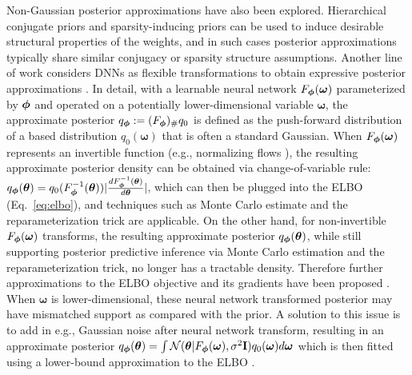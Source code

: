 Non-Gaussian posterior approximations have also been explored. Hierarchical conjugate priors \citep{kessler2021ibpbnn} and sparsity-inducing priors \citep{ghosh2019model,bai2020efficient} can be used to induce desirable structural properties of the weights, and in such cases posterior approximations typically share similar conjugacy or sparsity structure assumptions. 
%
Another line of work considers DNNs as flexible transformations to obtain expressive posterior approximations \citep{louizos2017multiplicative,tran:implicit2017,mescheder2017adversarial,li2018gradient}. In detail, with a learnable neural network $F_{\bm{\phi}}(\bm{\omega
})$ parameterized by $\bm{\phi}$ and operated on a potentially lower-dimensional variable $\bm{\omega}$, the approximate posterior $q_{\bm{\phi}} := (F_{\bm{\phi}})_{\#}q_0$ is defined as the push-forward distribution of a based distribution $q_0(\bm{\omega})$ that is often a standard Gaussian. 
%
When $F_{\bm{\phi}}(\bm{\omega
})$ represents an invertible function (e.g., normalizing flows \citep{rezende2015variational,louizos2017multiplicative, papamakarios2021normalizing}), the resulting approximate posterior density can be obtained via change-of-variable rule: $q_{\bm{\phi}}(\bm{\theta}) = q_0(F_{\bm{\phi}}^{-1}(\bm{\theta})) | \frac{d F^{-1}_{\bm{\phi}}(\bm{\theta})}{d \bm{\theta}}|$,
which can then be plugged into the ELBO (Eq.~\eqref{eq:elbo}), and techniques such as Monte Carlo estimate and the reparameterization trick are applicable.
%
On the other hand, for non-invertible $F_{\bm{\phi}}(\bm{\omega
})$ transforms, the resulting approximate posterior $q_{\bm{\phi}}(\bm{\theta})$, while still supporting posterior predictive inference via Monte Carlo estimation and the reparameterization trick, no longer has a tractable density. Therefore further approximations to the ELBO objective and its gradients have been proposed \citep{mescheder2017adversarial,li2018gradient}. 
%
When $\bm{\omega}$ is lower-dimensional, these neural network transformed posterior may have mismatched support as compared with the prior. A solution to this issue is to add in e.g., Gaussian noise after neural network transform, resulting in an approximate posterior $q_{\bm{\phi}}(\bm{\theta}) = \int \mathcal{N}(\bm{\theta} | F_{\bm{\phi}}(\bm{\omega}), \sigma^2 \mathbf{I})q_0(\bm{\omega}) d\bm{\omega}$ which is then fitted using a lower-bound approximation to the ELBO \citep{salimans2015markov,yin2018semi}.